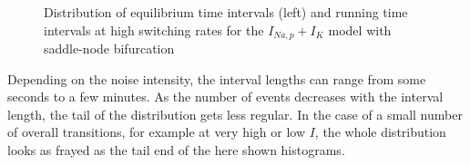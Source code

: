 \documentclass[12pt,a4paper]{article}
\begin{document}
\begin{figure}[H]
	\hspace*{-0.5cm}
	\caption{Distribution of equilibrium time intervals (left) and running time intervals at high switching rates for the $I_{Na,p}+I_K$ model with saddle-node bifurcation}
	\label{intdistgood}
\end{figure}
Depending on the noise intensity, the interval lengths can range from some seconds to a few minutes. As the number of events decreases with the interval length, the tail of the distribution gets less regular. In the case of a small number of overall transitions, for example at very high or low $I$, the whole distribution looks as frayed as the tail end of the here shown histograms. \\
\end{document}
